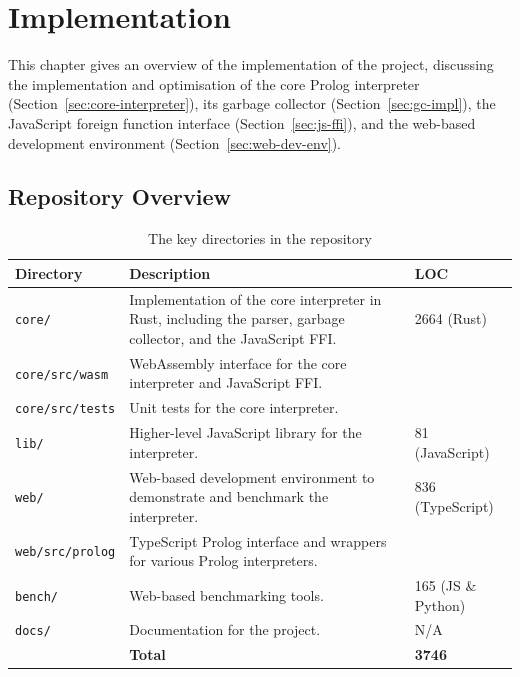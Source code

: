 
\chapter{Implementation}

This chapter gives an overview of the implementation of the project, discussing the implementation and optimisation of the core Prolog interpreter (Section~\ref{sec:core-interpreter}), its garbage collector (Section~\ref{sec:gc-impl}), the JavaScript foreign function interface (Section~\ref{sec:js-ffi}), and the web-based development environment (Section~\ref{sec:web-dev-env}).

\section{Repository Overview}

\begin{table}[H]
\centering
\begin{tabular}{lp{9cm}l}
\hline
\textbf{Directory} & \textbf{Description} & \textbf{LOC} \\
\hline
\texttt{core/} & Implementation of the core interpreter in Rust, including the parser, garbage collector, and the JavaScript FFI. & 2664 (Rust) \\
\texttt{core/src/wasm} & WebAssembly interface for the core interpreter and JavaScript FFI. & \\
\texttt{core/src/tests} & Unit tests for the core interpreter. & \\
\texttt{lib/} & Higher-level JavaScript library for the interpreter. & 81 (JavaScript) \\
\texttt{web/} & Web-based development environment to demonstrate and benchmark the interpreter. & 836 (TypeScript) \\
\texttt{web/src/prolog} & TypeScript Prolog interface and wrappers for various Prolog interpreters. & \\
\texttt{bench/} & Web-based benchmarking tools. & 165 (JS \& Python) \\
\texttt{docs/} & Documentation for the project. & N/A \\
\hline
& \hfill \textbf{Total} & \textbf{3746} \\
\hline
\end{tabular}
\caption{The key directories in the repository}
\label{tab:repository-overview}
\end{table}


